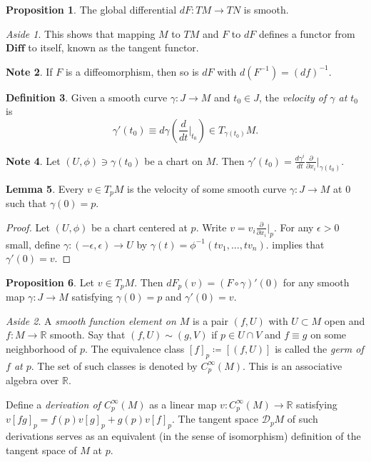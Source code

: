 \documentclass[10pt,letterpaper,cm]{nupset}
\theoremstyle{definition}
\newtheorem{definition}{Definition}[subsection]
\newtheorem{note}[definition]{Note}
\theoremstyle{theorem}
\newtheorem{lemma}[definition]{Lemma}
\newtheorem{prop}[definition]{Proposition}
\theoremstyle{remark}
\newtheorem*{aside}{Aside}
\newcommand{\R}{\mathbb R}
\newcommand{\1}{\mathbf{1}}
\newcommand{\0}{\vec 0}
\begin{document}
\begin{prop}
The global differential $dF: TM \to TN$ is smooth.
\end{prop}

\begin{aside}
This shows that mapping $M$ to $TM$ and $F$ to $dF$ defines a functor from $\mathbf{Diff}$ to itself, known as the tangent functor.
\end{aside}

\begin{note}
If $F$ is a diffeomorphism, then so is $dF$ with $d(F^{-1}) = \left(df\right)^{-1}$.
\end{note}

\bigskip

\begin{definition}
Given a smooth curve $\gamma : J \to M$ and $t_0 \in J$, the \textit{velocity of $\gamma$ at $t_0$} is  $$\gamma'(t_0) \equiv d\gamma \left(\frac{d}{dt}\bigr\rvert_{t_0} \right) \in T_{\gamma(t_0)}M.$$
\end{definition}

\begin{note}\label{rem}
Let $(U, \phi) \ni \gamma(t_0)$ be a chart on $M$. Then $\gamma'(t_0) = \frac{d\gamma^i}{dt} \frac{\partial}{\partial{x_i}}\bigr\rvert_{\gamma(t_0)}$.
\end{note}

\begin{lemma}
Every $v \in T_pM$ is the velocity of some smooth curve $\gamma : J \to M$ at $0$ such that $\gamma(0)=p$.
\end{lemma}
\begin{proof}
Let $(U, \phi)$ be a chart centered at $p$. Write $v = v_i \frac{\partial}{\partial{x_i}}\bigr\rvert_{p}$. For any $\epsilon >0$ small, define $\gamma: \left({-\epsilon} , \epsilon\right) \to U$ by $\gamma(t) = \phi^{-1}(tv_1, \ldots, tv_n)$.  implies that $\gamma'(0) = v$.
\end{proof}

\begin{prop}
Let $v \in T_pM$. Then $dF_p(v) = (F \circ \gamma)'(0)$ for any smooth map $\gamma : J \to M$ satisfying $\gamma(0)=p$ and $\gamma'(0) =v$.
\end{prop}

\begin{aside}
A \textit{smooth function element on $M$} is a pair $(f, U)$ with $U\subset M$ open and $f: M \to \R$ smooth. Say that $(f, U) \sim (g, V)$ if $p\in U \cap V$ and $f \equiv g$ on some neighborhood of $p$. The equivalence  class $[f]_p \coloneqq \left[(f, U)\right]$ is called the \textit{germ of $f$ at $p$}. The set of such classes is denoted by $C^{\infty}_p(M)$. This is an associative algebra over $\R$. 

 Define a \textit{derivation of $C^{\infty}_p(M)$} as a linear map $v: C^{\infty}_p(M) \to \R$ satisfying $v[fg]_p = f(p)v[g]_p+g(p)v[f]_p$.  The tangent space $\mathcal{D}_pM$ of such derivations serves as an equivalent (in the sense of isomorphism) definition of the tangent space of $M$ at $p$.
\end{aside}
\end{document}
